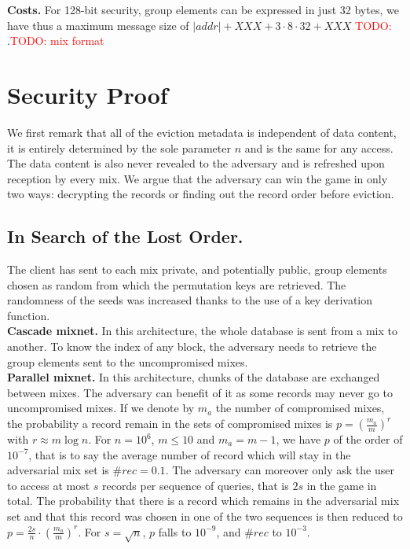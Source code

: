 \documentclass{llncs}
\newcommand{\todo}[1]{\textcolor{red}{TODO: #1}}
\begin{document}
\noindent\textbf{Costs.} For 128-bit security, group elements can be expressed in just 32 bytes, we have thus a maximum message size of $|addr|+XXX + 3 \cdot 8 \cdot 32 + XXX$ \todo{}.\todo{ mix format}

\section{Security Proof}\label{Security}

We first remark that all of the eviction metadata is independent of data content, it is entirely determined by the sole parameter $n$ and is the same for any access. The data content is also never revealed to the adversary and is refreshed upon reception by every mix.
We argue that the adversary can win the game in only two ways: decrypting the records or finding out the record order before eviction. 

\subsection{In Search of the Lost Order.}
The client has sent to each mix private, and potentially public, group elements chosen as random from which the permutation keys are retrieved. The randomness of the seeds was increased thanks to the use of a key derivation function.\\

\noindent\textbf{Cascade mixnet.}
In this architecture, the whole database is sent from a mix to another. To know the index of any block, the adversary needs to retrieve the group elements sent to the uncompromised mixes. \\

\noindent\textbf{Parallel mixnet.}
In this architecture, chunks of the database are exchanged between mixes. The adversary can benefit of it as some records may never go to uncompromised mixes. If we denote by $m_a$ the number of compromised mixes, the probability a record remain in the sets of compromised mixes is $p = \left ( \frac{m_a}{m}\right )^r$ with $r\approx m\log n$.
For $n=10^6$, $m \leq 10$ and $m_a=m-1$, we have $p$ of the order of $10^{-7}$, that is to say the average number of record which will stay in the adversarial mix set is $\#rec = 0.1$.
The adversary can moreover only ask the user to access at most $s$ records per sequence of queries, that is $2s$ in the game in total. The probability that there is a record which remains in the adversarial mix set and that this record was chosen in one of the two sequences is then reduced to $p = \frac{2s}{n}\cdot\left (\frac{m_a}{m}\right )^r$. For $s=\sqrt n$, $p$ falls to $10^{-9}$, and $\#rec$ to $10^{-3}$.
\end{document}
